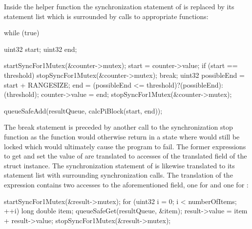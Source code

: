 Inside the helper function  the synchronization statement of  is replaced by its statement list which is surrounded by calls to appropriate functions:
\begin{ccode}
while (true) {
  uint32 start; 
  uint32 end;
  
  startSyncFor1Mutex(&counter->mutex); 
  { 
    start = counter->value; 
    if (start == threshold) { 
      stopSyncFor1Mutex(&counter->mutex); 
      break; 
    }
    uint32 possibleEnd = start + RANGESIZE; 
    end = (possibleEnd <= threshold)?(possibleEnd):(threshold); 
    counter->value = end; 
  } 
  stopSyncFor1Mutex(&counter->mutex);
  
  queueSafeAdd(resultQueue, calcPiBlock(start, end));
}
\end{ccode}
The break statement is preceded by another call to the synchronization stop function as the function would otherwise return in a state where  would still be locked which would ultimately cause the program to fail. The former expressions to get and set the value of  are translated to accesses of the translated  field of the  struct instance. The synchronization statement of  is likewise translated to its statement list with surrounding synchronization calls. The translation of the expression  contains two accesses to the aforementioned  field, one for  and one for :
\begin{ccode}
startSyncFor1Mutex(&result->mutex); 
{ 
  for (uint32 i = 0; i < numberOfItems; ++i) { 
    long double item; 
    queueSafeGet(resultQueue, &item); 
    result->value = item + result->value; 
  }
} 
stopSyncFor1Mutex(&result->mutex);
\end{ccode}
